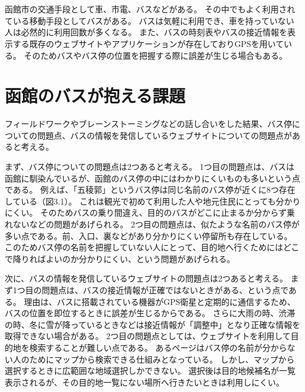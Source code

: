 \documentclass[openany,11pt,papersize]{jsbook}
\begin{document}
\section{}

函館市の交通手段として車、市電、バスなどがある。
その中でもよく利用されている移動手段としてバスがある。
バスは気軽に利用でき、車を持っていない人は必然的に利用回数が多くなる。
また、バスの時刻表やバスの接近情報を表示する既存のウェブサイトやアプリケーションが存在しておりGPSを用いている。
そのためバスやバス停の位置を把握する際に誤差が生じる場合もある。


\section{函館のバスが抱える課題}

フィールドワークやブレーンストーミングなどの話し合いをした結果、バス停についての問題点、バスの情報を発信しているウェブサイトについての問題点があると考える。

まず、バス停についての問題点は2つあると考える。
1つ目の問題点は、バスは函館に馴染んでいるが、函館のバス停の中にはわかりにくいものも多いという点である。
例えば、「五稜郭」というバス停は同じ名前のバス停が近くに8つ存在している（図3.1）。
これは観光で初めて利用した人や地元住民にとっても分かりにくい。
そのためバスの乗り間違え、目的のバスがどこに止まるか分からず乗れないなどの問題があげられる。
2つ目の問題点は、似たような名前のバス停が多い点である。前、入口、裏などがあり分かりにくい停留所も存在している。
このためバス停の名前を把握していない人にとって、目的地へ行くためにはどこで降りればよいのか分かりにくい、という問題があげられる。

次に、バスの情報を発信しているウェブサイトの問題点は2つあると考える。
まず1つ目の問題点は、バスの接近情報が正確ではないときがある、という点である。
理由は、バスに搭載されている機器がGPS衛星と定期的に通信するため、バスの位置を即位するときに誤差が生じるからである。
さらに大雨の時、渋滞の時、冬に雪が降っているときなどは接近情報が「調整中」となり正確な情報を取得できない場合がある。
2つ目の問題点としては、ウェブサイトを利用して目的地を検索することが難しい点である。
あるページはバス停の名前が分からない人のためにマップから検索できる仕組みとなっている。
しかし、マップから選択するときに広範囲な地域選択しかできない。
選択後は目的地候補名が一覧表示されるが、その目的地一覧にない場所へ行きたいときは利用しにくい。

\end{document}
